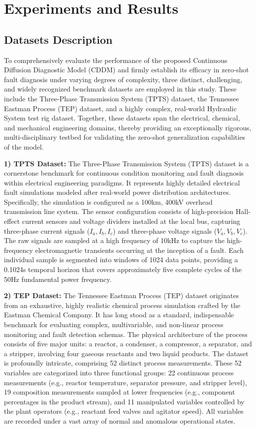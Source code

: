 \section{Experiments and Results}
\label{sec:experiments}

\subsection{Datasets Description}
To comprehensively evaluate the performance of the proposed Continuous Diffusion Diagnostic Model (CDDM) and firmly establish its efficacy in zero-shot fault diagnosis under varying degrees of complexity, three distinct, challenging, and widely recognized benchmark datasets are employed in this study. These include the Three-Phase Transmission System (TPTS) dataset, the Tennessee Eastman Process (TEP) dataset, and a highly complex, real-world Hydraulic System test rig dataset. Together, these datasets span the electrical, chemical, and mechanical engineering domains, thereby providing an exceptionally rigorous, multi-disciplinary testbed for validating the zero-shot generalization capabilities of the model.

\textbf{1) TPTS Dataset:} The Three-Phase Transmission System (TPTS) dataset is a cornerstone benchmark for continuous condition monitoring and fault diagnosis within electrical engineering paradigms. It represents highly detailed electrical fault simulations modeled after real-world power distribution architectures. Specifically, the simulation is configured as a 100km, 400kV overhead transmission line system. The sensor configuration consists of high-precision Hall-effect current sensors and voltage dividers installed at the local bus, capturing three-phase current signals ($I_a, I_b, I_c$) and three-phase voltage signals ($V_a, V_b, V_c$). The raw signals are sampled at a high frequency of 10kHz to capture the high-frequency electromagnetic transients occurring at the inception of a fault. Each individual sample is segmented into windows of 1024 data points, providing a 0.1024s temporal horizon that covers approximately five complete cycles of the 50Hz fundamental power frequency.

\textbf{2) TEP Dataset:} The Tennessee Eastman Process (TEP) dataset originates from an exhaustive, highly realistic chemical process simulation crafted by the Eastman Chemical Company. It has long stood as a standard, indispensable benchmark for evaluating complex, multivariable, and non-linear process monitoring and fault detection schemas. The physical architecture of the process consists of five major units: a reactor, a condenser, a compressor, a separator, and a stripper, involving four gaseous reactants and two liquid products. The dataset is profoundly intricate, comprising 52 distinct process measurements. These 52 variables are categorized into three functional groups: 22 continuous process measurements (e.g., reactor temperature, separator pressure, and stripper level), 19 composition measurements sampled at lower frequencies (e.g., component percentages in the product stream), and 11 manipulated variables controlled by the plant operators (e.g., reactant feed valves and agitator speed). All variables are recorded under a vast array of normal and anomalous operational states.

